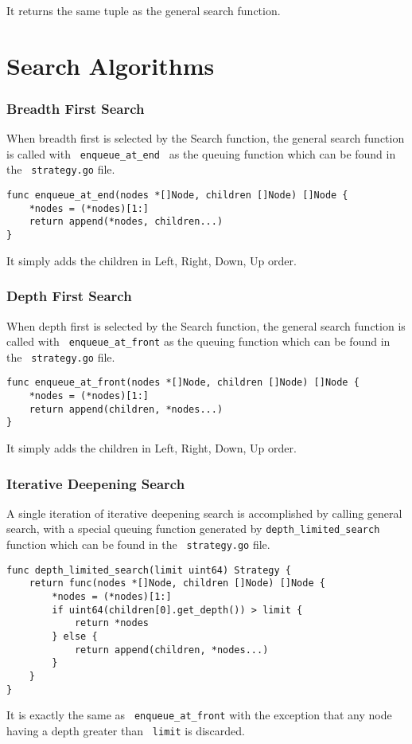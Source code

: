 \documentclass[14pt,a4paper]{report}
\begin{document}
It returns the same tuple as the general search function.



\part{Search Algorithms}
\section{Breadth First Search}
When breadth first is selected by the Search function, the general search function is called
with \verb+ enqueue_at_end + as the queuing function which can be found in the \verb+ strategy.go+ file.
\begin{lstlisting}
func enqueue_at_end(nodes *[]Node, children []Node) []Node {
    *nodes = (*nodes)[1:]
    return append(*nodes, children...)
}
\end{lstlisting}
It simply adds the children in Left, Right, Down, Up order.
\section{Depth First Search}
When depth first is selected by the Search function, the general search function is called
with \verb+ enqueue_at_front+ as the queuing function which can be found in the \verb+ strategy.go+ file.
\begin{lstlisting}
func enqueue_at_front(nodes *[]Node, children []Node) []Node {
    *nodes = (*nodes)[1:]
    return append(children, *nodes...)
}
\end{lstlisting}
It simply adds the children in Left, Right, Down, Up order.
\section{Iterative Deepening Search}
A single iteration of iterative deepening search is accomplished by calling general search,
with a special queuing function generated by \verb+depth_limited_search+ function which can be 
found in the \verb+ strategy.go+ file.
\begin{lstlisting}
func depth_limited_search(limit uint64) Strategy {
    return func(nodes *[]Node, children []Node) []Node {
        *nodes = (*nodes)[1:]
        if uint64(children[0].get_depth()) > limit {
            return *nodes
        } else {
            return append(children, *nodes...)
        }
    }
} 
\end{lstlisting}
It is exactly the same as \verb+ enqueue_at_front+ with the exception that any node
having a depth greater than \verb+ limit+ is discarded.
\end{document}
